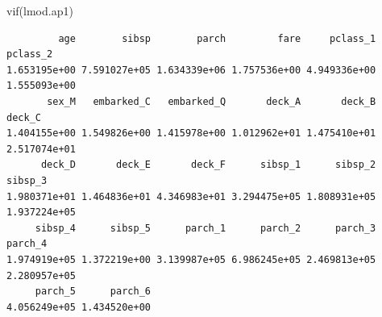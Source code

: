 \documentclass[
  letterpaper,
  DIV=11,
  numbers=noendperiod]{scrartcl}
\newenvironment{Shaded}{\begin{snugshade}}{\end{snugshade}}
\newcommand{\FunctionTok}[1]{\textcolor[rgb]{0.28,0.35,0.67}{#1}}
\newcommand{\NormalTok}[1]{\textcolor[rgb]{0.00,0.23,0.31}{#1}}
\begin{document}
\begin{Shaded}
\begin{Highlighting}[]
\FunctionTok{vif}\NormalTok{(lmod.ap1)}
\end{Highlighting}
\end{Shaded}

\begin{verbatim}
         age        sibsp        parch         fare     pclass_1     pclass_2 
1.653195e+00 7.591027e+05 1.634339e+06 1.757536e+00 4.949336e+00 1.555093e+00 
       sex_M   embarked_C   embarked_Q       deck_A       deck_B       deck_C 
1.404155e+00 1.549826e+00 1.415978e+00 1.012962e+01 1.475410e+01 2.517074e+01 
      deck_D       deck_E       deck_F      sibsp_1      sibsp_2      sibsp_3 
1.980371e+01 1.464836e+01 4.346983e+01 3.294475e+05 1.808931e+05 1.937224e+05 
     sibsp_4      sibsp_5      parch_1      parch_2      parch_3      parch_4 
1.974919e+05 1.372219e+00 3.139987e+05 6.986245e+05 2.469813e+05 2.280957e+05 
     parch_5      parch_6 
4.056249e+05 1.434520e+00 
\end{verbatim}
\end{document}
